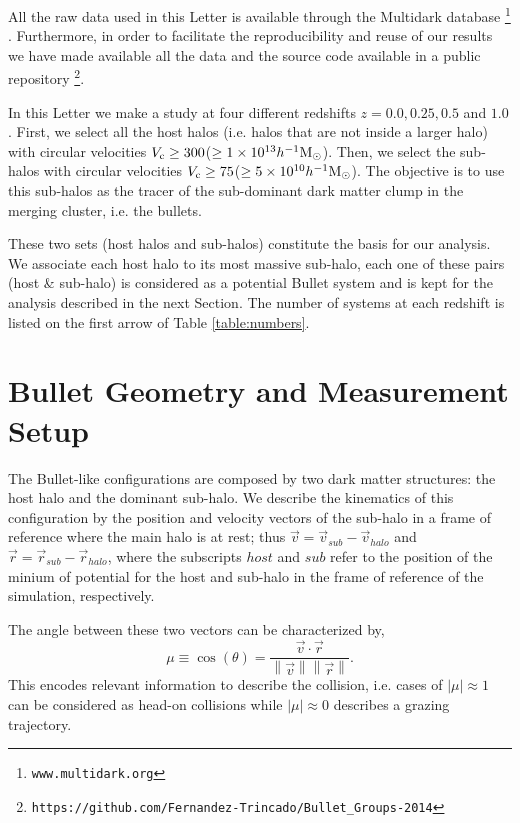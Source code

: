 \documentclass{emulateapj}
\newcommand{\hMsun}{{\ifmmode{h^{-1}{\rm {M_{\odot}}}}\else{$h^{-1}{\rm{M_{\odot}}}$}\fi}}
\newcommand{\kms}{{\ifmmode{{\mathrm{\,km\ s}^{-1}}}\else{\,km~s$^{-1}$}\fi}}
\begin{document}
All the raw data used in this Letter is available through the
Multidark database \footnote{\texttt{www.multidark.org}}
\citep{Riebe2013}.  Furthermore, in order to facilitate the
reproducibility and reuse of our results we have made available all
the data and the source code available in a public
repository \footnote{\texttt{https://github.com/Fernandez-Trincado/Bullet\_Groups-2014}}. 

In this Letter we make a study at four different redshifts $z=0.0,0.25,
0.5$ and $1.0$. First, we select all the host halos (i.e. halos that
are not inside a larger halo) with circular velocities $V_{\rm c}\geq
300$\kms ($\geq 1\times 10^{13} \hMsun$). Then, we select the sub-halos with
circular velocities $V_{\rm c}\geq 75$\kms ($\geq 5\times
10^{10}\hMsun$). The objective is to use this sub-halos as the tracer
of the sub-dominant dark matter clump in the merging cluster, i.e. the
bullets. 

These two sets (host halos and sub-halos)
constitute the basis for our analysis. We associate each host halo
to its most massive sub-halo, each one of these pairs (host \& sub-halo)
is considered as a potential Bullet system and is kept for the
analysis described in the next Section. The number of systems at each
redshift is listed on the first arrow of Table \ref{table:numbers}.

\section{Bullet Geometry and Measurement Setup}
\label{sec:setup}

The Bullet-like configurations are composed by two dark matter
structures: the host halo and the dominant sub-halo. We describe the
kinematics of this configuration by the 
position and velocity vectors of the sub-halo in a frame of reference
where the main halo is at rest; thus
$\vec{v{}}=\vec{v}_{sub}-\vec{v}_{halo}$ and
$\vec{r}=\vec{r}_{sub}-\vec{r}_{halo}$, where the subscripts $host$
and $sub$ refer to the position of the minium of potential for the
host and sub-halo in the frame of reference of the simulation,
respectively.  

The angle between these two vectors can be characterized by, 
\begin{equation}
  \mu\equiv
  \cos(\theta)=\frac{\vec{v{}}\cdotp{}\vec{r}}{\left\|\vec{v}{}\right\|
    \left\|\vec{r}\right\|} .
 \end{equation} 
%
This encodes relevant information to describe the collision,
i.e. cases of $|\mu|\approx 1$ can be considered as head-on collisions
while $|\mu|\approx 0$ describes a grazing trajectory.
\end{document}
